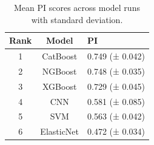 \begin{table}
\centering
\caption{Mean PI scores across model runs with standard deviation.}
\label{tab:pi_scores}
\begin{tabular}{ccl}
\toprule
 Rank &      Model &              PI \\
\midrule
    1 &   CatBoost & 0.749 (± 0.042) \\
    2 &    NGBoost & 0.748 (± 0.035) \\
    3 &    XGBoost & 0.729 (± 0.045) \\
    4 &        CNN & 0.581 (± 0.085) \\
    5 &        SVM & 0.563 (± 0.042) \\
    6 & ElasticNet & 0.472 (± 0.034) \\
\bottomrule
\end{tabular}
\end{table}
